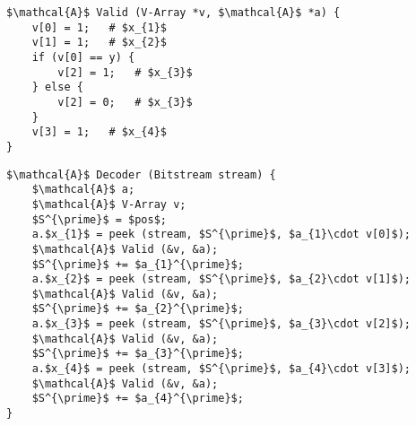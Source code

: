 \documentclass[parskip=half,paper=a4,DIV=13]{scrartcl}
\begin{document}
\begin{lstlisting}[mathescape]
$\mathcal{A}$ Valid (V-Array *v, $\mathcal{A}$ *a) {
	v[0] = 1;	# $x_{1}$
	v[1] = 1;	# $x_{2}$
	if (v[0] == y) {
		v[2] = 1;	# $x_{3}$
	} else {
		v[2] = 0;	# $x_{3}$
	}
	v[3] = 1;	# $x_{4}$
}
\end{lstlisting}

\begin{lstlisting}[mathescape]
$\mathcal{A}$ Decoder (Bitstream stream) {
	$\mathcal{A}$ a;
	$\mathcal{A}$ V-Array v;
	$S^{\prime}$ = $pos$;
	a.$x_{1}$ = peek (stream, $S^{\prime}$, $a_{1}\cdot v[0]$);
	$\mathcal{A}$ Valid (&v, &a);
	$S^{\prime}$ += $a_{1}^{\prime}$;
	a.$x_{2}$ = peek (stream, $S^{\prime}$, $a_{2}\cdot v[1]$);
	$\mathcal{A}$ Valid (&v, &a);
	$S^{\prime}$ += $a_{2}^{\prime}$;
	a.$x_{3}$ = peek (stream, $S^{\prime}$, $a_{3}\cdot v[2]$);
	$\mathcal{A}$ Valid (&v, &a);
	$S^{\prime}$ += $a_{3}^{\prime}$;
	a.$x_{4}$ = peek (stream, $S^{\prime}$, $a_{4}\cdot v[3]$);
	$\mathcal{A}$ Valid (&v, &a);
	$S^{\prime}$ += $a_{4}^{\prime}$;
}
\end{lstlisting}
\end{document}
